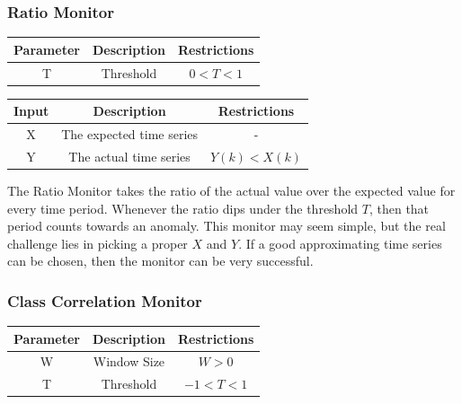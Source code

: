 \documentclass[12pt]{ucthesis}
\begin{document}
\subsubsection{Ratio Monitor}
\label{outage-detection-monitors-Ratio}
\begin{table}[H]
   \begin{center}
      \begin{tabular}{|c|c|c|}
         \hline
            Parameter & Description & Restrictions \\
         \hline
            T & Threshold & $ 0 < T < 1 $\\
         \hline
      \end{tabular}
   \end{center}
\end{table}

\begin{table}[H]
   \begin{center}
      \begin{tabular}{|c|c|c|}
         \hline
            Input & Description & Restrictions \\
         \hline
            X & The expected time series & - \\
         \hline
            Y & The actual time series & $ Y(k) < X(k) $\\
         \hline
      \end{tabular}
   \end{center}
\end{table}

The Ratio Monitor takes the ratio of the actual value over the expected value for every time period.
Whenever the ratio dips under the threshold $T$, then that period counts towards an anomaly.
This monitor may seem simple, but the real challenge lies in picking a proper $X$ and $Y$.
If a good approximating time series can be chosen, then the monitor can be very successful.

\subsubsection{Class Correlation Monitor}
\label{outage-detection-monitors-Correlation}
\begin{table}[H]
   \begin{center}
      \begin{tabular}{|c|c|c|}
         \hline
            Parameter & Description & Restrictions \\
         \hline
            W & Window Size & $ W > 0 $\\
         \hline
            T & Threshold & $ -1 < T < 1 $\\
         \hline
      \end{tabular}
   \end{center}
\end{table}
\end{document}
